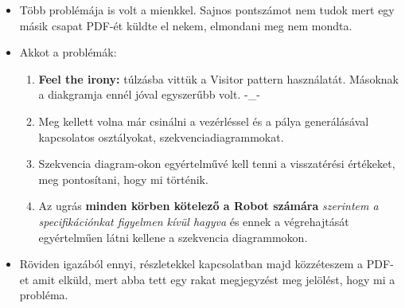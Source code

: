 \documentclass{article}
\begin{document}
\begin{itemize}
	\item Több problémája is volt a mienkkel. Sajnos pontszámot nem tudok mert egy másik csapat PDF-ét küldte el nekem, elmondani meg nem mondta.
	\item Akkot a problémák:
	\begin{enumerate}
		\item \textbf{Feel the irony:} túlzásba vittük a Visitor pattern használatát. Másoknak a diakgramja ennél jóval egyszerűbb volt. -\_-
		\item Meg kellett volna már csinálni a vezérléssel és a pálya generálásával kapcsolatos osztályokat, szekvenciadiagrammokat.
		\item Szekvencia diagram-okon egyértelművé kell tenni a visszatérési értékeket, meg pontosítani, hogy mi történik.
		\item Az ugrás \textbf{minden körben kötelező a Robot számára} \textit{szerintem a specifikációnkat figyelmen kívül hagyva} és ennek a végrehajtását egyértelműen látni kellene a szekvencia diagrammokon. 
	\end{enumerate}
	\item Röviden igazából ennyi, részletekkel kapcsolatban majd közzéteszem a PDF-et amit elküld, mert abba tett egy rakat megjegyzést meg jelölést, hogy mi a probléma.
\end{itemize}
\end{document}
